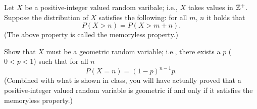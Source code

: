 \begin{problem}
  Let \(X\) be a positive-integer valued random varibale; i.e., \(X\) takes
  values in \(\mathbb{Z}^+\). Suppose the distribution of \(X\) satisfies the
  following: for all \(m\), \(n\) it holds that
  \[
    P(X>n)=P(X>m+n).
  \]
  (The above property is called the memoryless property.)

  Show that \(X\) must be a geometric random variable; i.e., there exists a
  \(p\) (\(0<p<1\)) such that for all \(n\)
  \[
    P(X=n)=(1-p)^{n-1}p.
  \]
  (Combined with what is shown in class, you will have actually proved that
  a positive-integer valued random variable is geometric if and only if it
  satisfies the memoryless property.)
\end{problem}
\begin{solution*}
\end{solution*}


